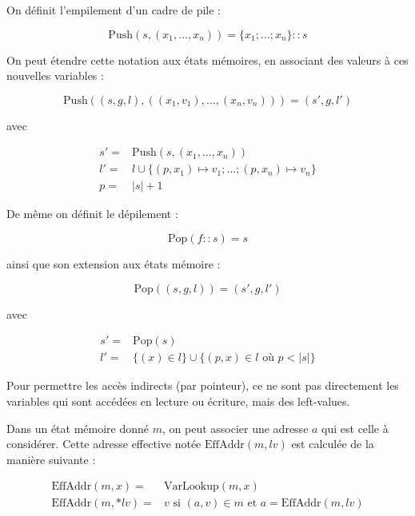 \begin{definition}

  On définit l'empilement d'un cadre de pile :

  \[
    \mathrm{Push}(s, (x_1, …, x_n)) = \{ x_1 ; … ; x_n \}::s
  \]

  On peut étendre cette notation aux états mémoires, en associant des valeurs à
  ces nouvelles variables :

  \[
    \mathrm{Push}((s, g, l), ((x_1, v_1), …, (x_n, v_n))) = (s', g, l')
  \]

  avec

  \begin{align*}
    s' = & \mathrm{Push}(s, (x_1, …, x_n)) \\
    l' = & l \cup \{(p, x_1) ↦ v_1; … ; (p, x_n) ↦ v_n\} \\
    p  = & |s| + 1
  \end{align*}

  De même on définit le dépilement :

  \[
    \mathrm{Pop}(f::s) = s
  \]

  ainsi que son extension aux états mémoire :

  \[
    \mathrm{Pop}((s, g, l)) = (s', g, l')
  \]

  avec

  \begin{align*}
    s' = & \mathrm{Pop}(s) \\
    l' = & \{ (x) ∈ l \} \cup \{ (p, x) ∈ l \mbox{ où } p < |s| \}
  \end{align*}

\end{definition}

\begin{definition}

  Pour permettre les accès indirects (par pointeur), ce ne sont pas directement
  les variables qui sont accédées en lecture ou écriture, mais des left-values.

  Dans un état mémoire donné $m$, on peut associer une adresse $a$ qui est celle
  à considérer. Cette adresse effective notée $\mathrm{EffAddr}(m, lv)$ est
  calculée de la manière suivante :

  \begin{align*}
    \mathrm{EffAddr}(m, x)   = & \mathrm{VarLookup}(m, x) \\
    \mathrm{EffAddr}(m, *lv) = & v \textrm{ si } (a, v) ∈ m
                                 \textrm{ et } a = \mathrm{EffAddr}(m, lv)
  \end{align*}
\end{definition}

